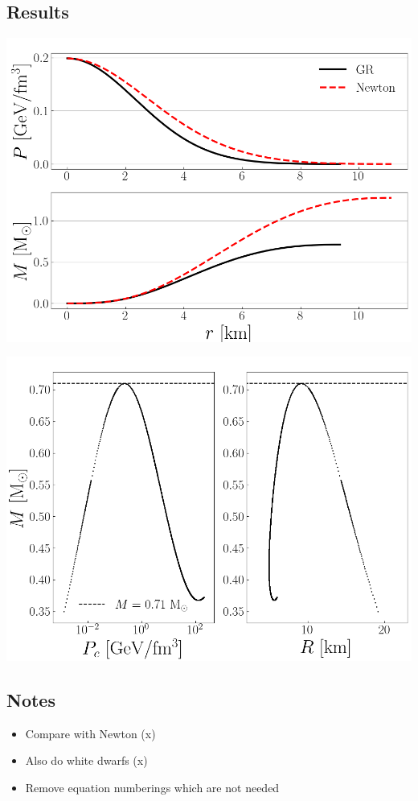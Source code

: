 \documentclass[twocolumn]{article}
\begin{document}
\begin{large}
\subsection*{Results}
\begin{center}
    \includegraphics[scale=0.35]{Newt.png}
\end{center}
\begin{center}
    \includegraphics[scale=0.35]{TOV_limit.png}
\end{center}



\subsection*{Notes}
\begin{itemize}
    \item Compare with Newton  (x)
    \item Also do white dwarfs (x)
    \item Remove equation numberings which are not needed
\end{itemize}




\end{large}
\end{document}
